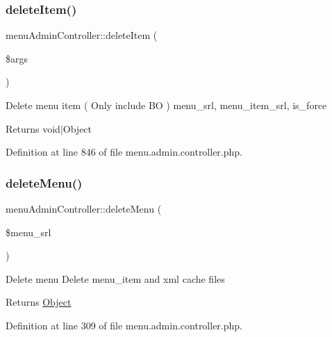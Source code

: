 \mbox{\label{classmenuAdminController_a0a1051857eeec06de37b3d09729bd816}} 
\subsubsection{\texorpdfstring{delete\+Item()}{deleteItem()}}
{\footnotesize\ttfamily menu\+Admin\+Controller\+::delete\+Item (\begin{DoxyParamCaption}\item[{}]{\$args }\end{DoxyParamCaption})}

Delete menu item ( Only include BO )  menu\+\_\+srl, menu\+\_\+item\+\_\+srl, is\+\_\+force \begin{DoxyReturn}{Returns}
void$\vert$\+Object 
\end{DoxyReturn}


Definition at line 846 of file menu.\+admin.\+controller.\+php.

\mbox{\label{classmenuAdminController_a586b343461b2f2f5e66fd92dd5ed04df}} 
\subsubsection{\texorpdfstring{delete\+Menu()}{deleteMenu()}}
{\footnotesize\ttfamily menu\+Admin\+Controller\+::delete\+Menu (\begin{DoxyParamCaption}\item[{}]{\$menu\+\_\+srl }\end{DoxyParamCaption})}

Delete menu Delete menu\+\_\+item and xml cache files \begin{DoxyReturn}{Returns}
\hyperlink{classObject}{Object} 
\end{DoxyReturn}


Definition at line 309 of file menu.\+admin.\+controller.\+php.

\mbox{\label{classmenuAdminController_a1aac19bba8c7abfc8a284b1d3c8b4424}} 
